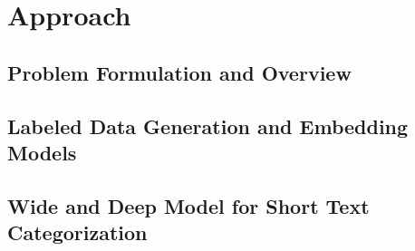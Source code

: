 \section{Approach} \label{anno_salient:framework}
\subsection{Problem Formulation and Overview}
\subsection{Labeled Data Generation and Embedding Models}

\subsection{Wide and Deep Model for Short Text Categorization}